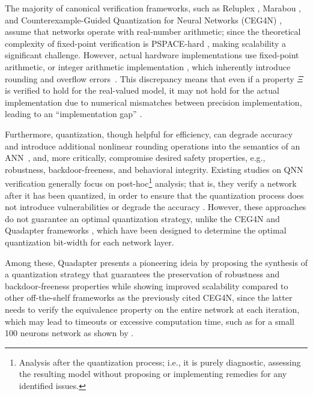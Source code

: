 The majority of canonical verification frameworks, such as Reluplex \cite{katz2017reluplex}, Marabou \cite{amir2021smt}, and Counterexample-Guided Quantization for Neural Networks (CEG4N) \cite{abdi2021counterexample}, assume that networks operate with real-number arithmetic; since the theoretical complexity of fixed-point verification is PSPACE-hard \cite{henzinger2021scalable}, making scalability a significant challenge. However, actual hardware implementations use fixed-point arithmetic, or integer arithmetic implementation \cite{choukrounLowbitQuantizationNeural2019a}, which inherently introduce rounding and overflow errors~\cite{han2020understanding}. This discrepancy means that even if a property $\Xi$ is verified to {hold} for the real-valued model, it may not hold for the actual implementation due to numerical mismatches between precision implementation, leading to an ``implementation gap'' \cite{cordeiro2025neuralnetworkverificationprogramming}.

Furthermore, quantization, though helpful for efficiency, can degrade accuracy and introduce additional nonlinear rounding operations into the semantics of an ANN~\cite{giacobbe2020how}, and, more critically, compromise desired safety properties, e.g., robustness, backdoor-freeness, and behavioral integrity. Existing studies on QNN verification generally focus on post-hoc\footnote{Analysis after the quantization process; i.e., it is purely diagnostic, assessing the resulting model without proposing or implementing remedies for any identified issues.} analysis; that is, they verify a network after it has been quantized, in order to ensure that the quantization process does not introduce vulnerabilities or degrade the accuracy \cite{katz2017reluplex, baranowski2020smt, eleftheriadis2022neuralnetworkequivalencechecking,song2023qnnrepair}. However, these approaches do not guarantee an optimal quantization strategy, unlike the CEG4N and Quadapter frameworks \cite{abdi2021counterexample,cai2025certified}, which have been designed to determine the optimal quantization bit-width for each network layer. 


Among these, Quadapter presents a pioneering ideia by proposing the synthesis of a quantization strategy that guarantees the preservation of robustness and backdoor-freeness properties while showing improved scalability compared to other off-the-shelf frameworks as the previously cited CEG4N, since the latter needs to verify the equivalence property on the entire network at each iteration, which may lead to timeouts or excessive computation time, such as for a small 100 neurons network as shown by \cite{cai2025certified}.

